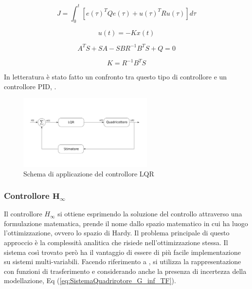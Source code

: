 \begin{equation}\label{eq:SistemaQuadrirotore_LQRCosto}
	J = \int_{0}^{t} \left[e(\tau)^T Q e(\tau) + u(\tau)^T R u(\tau)\right] d \tau
\end{equation}

\begin{equation}\label{eq:SistemaQuadrirotore_K_LQR}
	u(t) = -K x(t)
\end{equation}

\begin{equation}\label{eq:SistemaQuadrirotore_Ricatti}
	A^T S + S A - S B R^{-1} B^T S + Q = 0
\end{equation}

\begin{equation}\label{eq:SistemaQuadrirotore_Ricatti_sol}
	K = R^{-1} B^T S
\end{equation}

In letteratura è stato fatto un confronto tra questo tipo di controllore e un controllore PID, \cite{PID_vs_LQ}.

\begin{figure}
	\centering
	\includegraphics[width=0.6\textwidth]{SistemaQuadrirotore/Figure/LQR}
	\caption{Schema di applicazione del controllore LQR}
\end{figure}
 

\subsubsection{Controllore $\mathbf{H_\infty}$}

Il controllore $H_\infty$ si ottiene esprimendo la soluzione del controllo attraverso una formulazione matematica, prende il nome dallo spazio matematico in cui ha luogo l'ottimizzazione, ovvero lo spazio di Hardy. Il problema principale di questo approccio è la complessità analitica che risiede nell'ottimizzazione stessa. Il sistema così trovato però ha il vantaggio di essere di più facile implementazione su sistemi multi-variabili. Facendo riferimento a \cite{GrimbleM.J1991Hrcd}, si utilizza la rappresentazione con funzioni di trasferimento e considerando anche la presenza di incertezza della modellazione, Eq (\ref{eq:SistemaQuadrirotore_G_inf_TF}).

